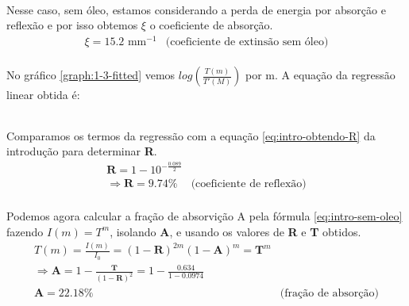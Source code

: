 \documentclass[a4paper,11pt]{article}
\begin{document}
\paragraph{}Nesse caso, sem óleo, estamos considerando a perda de energia por absorção e reflexão e por isso obtemos $\xi$ o coeficiente de absorção.
\begin{equation}
	\begin{array}{ll}
	\xi = 15.2 \mbox{ mm}^{-1} & \mbox{(coeficiente de extinsão sem óleo)}	
	\end{array}
\end{equation}


\paragraph{} No gráfico \ref{graph:1-3-fitted} vemos $log(\frac{T(m)}{T'(M)})$ por m. A equação da regressão linear obtida é:
\begin{equation}
	\begin{array}{rl}
		  & \\
	\end{array}
	\label{eq:1-3-1}
\end{equation}
\paragraph{} Comparamos os termos da regressão com a equação \ref{eq:intro-obtendo-R} da introdução para determinar \textbf{R}.
\begin{equation}
	\begin{array}{rl}
		  \textbf{R} = 1 - 10^{-\frac{0.089}{2}} &\\
		  \Rightarrow	 \textbf{R} = 9.74\% & \mbox{(coeficiente de reflexão)}
	\end{array}
	\label{eq:1-3}
\end{equation}



\paragraph{}Podemos agora calcular a fração de absorvição A pela fórmula \ref{eq:intro-sem-oleo} fazendo $I(m) = T^m$, isolando \textbf{A}, e usando os valores de \textbf{R} e \textbf{T} obtidos. 
\begin{equation}
	\begin{array}{ll}
	  T(m) = \frac{I(m)}{I_0} = (1 - \textbf{R})^{2m}(1- \textbf{A})^m = \textbf{T}^m &\\
	  \Rightarrow \textbf{A} = 1 - \frac{\textbf{T}}{(1 - \textbf{R})^2} = 1 - \frac{0.634}{1 - 0.0974} &\\
		\textbf{A} = 22.18\% & \mbox{(fração de absorção)}
	\end{array}
	\label{eq:1-4}
\end{equation}
\end{document}
